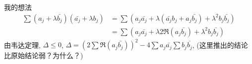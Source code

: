 我的想法
\begin{align*}
    \sum (a_j + \lambda \bar{b_j})(\bar{a_j} + \lambda b_j)
    &=\sum(a_j\bar{a_j}+\lambda(\bar{a_j}b_j+a_j\bar{b_j})+\lambda^2 b_j\bar{b_j})\\
    &=\sum(a_j\bar{a_j}+\lambda 2\Re(a_j\bar{b_j}) +\lambda^2 b_j\bar{b_j})
\end{align*}
由韦达定理, $\Delta \leq 0$, $\Delta = (2\sum\Re(a_j\bar{b_j}))^2-4\sum a_j\bar{a_j}\sum b_j\bar{b_j}$, 
(这里推出的结论比原始结论弱？为什么？)
    

